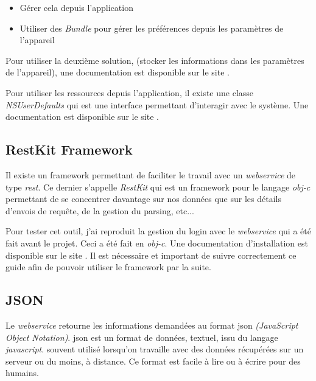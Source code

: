 \medskip

\begin{itemize}
  \item Gérer cela depuis l'application
  \item Utiliser des \emph{Bundle} pour gérer les préférences depuis les paramètres de l'appareil 
\end{itemize}

\medskip

Pour utiliser la deuxième solution, (stocker les informations dans les paramètres de l'appareil), une documentation est disponible sur le site \cite{online:iosbundle}.

\medskip

Pour utiliser les ressources depuis l'application, il existe une classe \emph{NSUserDefaults} qui est une interface permettant d'interagir avec le système.
Une documentation est disponible sur le site \cite{online:nsuserdefaults}.

\subsection{RestKit Framework}
Il existe un framework permettant de faciliter le travail avec un \emph{\gls{webservice}} de type \emph{\gls{rest}}. Ce dernier s'appelle \emph{RestKit} qui est un framework pour le langage \emph{\gls{obj-c}} permettant de se concentrer davantage sur nos données que sur les détails d'envois de requête, de la gestion du parsing, etc... 

\medskip

Pour tester cet outil, j'ai reproduit la gestion du login avec le \emph{\gls{webservice}} qui a été fait avant le projet. Ceci a été fait en \emph{\gls{obj-c}}. Une documentation d'installation est disponible sur le site \cite{online:restkit}. Il est nécessaire et important de suivre correctement ce guide afin de pouvoir utiliser le framework par la suite.




\subsection{JSON} %
\label{sub:}
Le \emph{\gls{webservice}} retourne les informations demandées au format \gls{json} \emph{(JavaScript Object Notation)}. \gls{json}  est un format de données, textuel, issu du langage \emph{\gls{javascript}}. souvent utilisé lorsqu'on travaille avec des données récupérées sur un serveur ou du moins, à distance. Ce format est facile à lire ou à écrire pour des humains.

